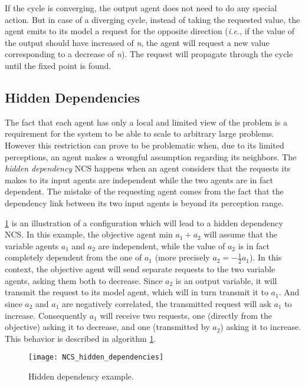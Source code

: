 If the cycle is converging, the output agent does not need to do any special action. But in case of a diverging cycle, instead of taking the requested value, the agent emits to its model a request for the opposite direction (\emph{i.e.}, if the value of the output should have increased of \emph{n}, the agent will request a new value corresponding to a decrease of \emph{n}). The request will propagate through the cycle until the fixed point is found.

\subsection{Hidden Dependencies}\label{hidden_deps}

The fact that each agent has only a local and limited view of the problem is a requirement for the system to be able to scale to arbitrary large problems. However this restriction can prove to be problematic when, due to its limited perceptions, an agent makes a wrongful assumption regarding its neighbors. The \emph{hidden dependency} NCS happens when an agent considers that the requests its makes to its input agents are independent while the two agents are in fact dependent. The mistake of the requesting agent comes from the fact that the dependency link between its two input agents is beyond its perception range.

\figurename{} \ref{NCS_hidden_dependencies} is an illustration of a configuration which will lead to a hidden dependency NCS. In this example, the objective agent $\text{min }a_1 + a_2$ will assume that the variable agents $a_1$ and $a_2$ are independent, while the value of $a_2$ is in fact completely dependent from the one of $a_1$ (more precisely $a_2 = -\frac{1}{2} a_1$). In this context, the objective agent will send separate requests to the two variable agents, asking them both to decrease. Since $a_2$ is an output variable, it will transmit the request to its model agent, which will in turn transmit it to $a_1$. And since $a_2$ and $a_1$ are negatively correlated, the transmitted request will ask $a_1$ to increase. Consequently $a_1$ will receive two requests, one (directly from the objective) asking it to decrease, and one (transmitted by $a_2$) asking it to increase.\\
This behavior is described in algorithm \ref{NCS_hidden_dependencies}.


\begin{figure}
\centering
\texttt{[image: NCS\_hidden\_dependencies]}
\caption{Hidden dependency example.}\label{NCS_hidden_dependencies}
\end{figure}


